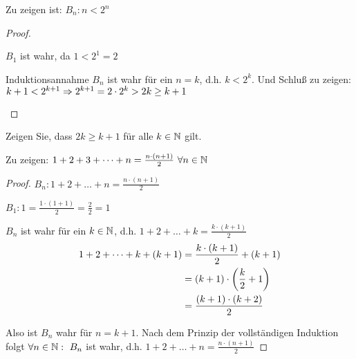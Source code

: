\begin{beispiel}
    Zu zeigen ist: $B_n: n < 2^{n}$
    \begin{proof}
        ~\\
        \begin{induktionsanfang}
            $B_1$ ist wahr, da $1<2^{1}=2$
        \end{induktionsanfang}
        \begin{induktionsschritt}
            Induktionsannahme $B_n$ ist wahr für ein $n=k$, d.h. $k<2^k$. Und Schluß zu zeigen: $k+1<2^{k+1} \Rightarrow{} 2^{k+1} = 2\cdot 2^{k} > 2k \geq k+1$\qedhere
        \end{induktionsschritt}
    \end{proof}
\end{beispiel}

\begin{uebung}
    Zeigen Sie, dass $2k\geq k+1$ für alle $k\in\mathbb{N}$ gilt.
\end{uebung}

\begin{beispiel}
    Zu zeigen: $1+2+3+\dots+n= \frac{n\cdot(n+1)}{2}~\forall n\in\mathbb{N}$
    \begin{proof}
        $B_n: 1+2+\dots+n = \frac{n\cdot(n+1)}{2}$\\
        \begin{induktionsanfang}
            $B_1: 1=\frac{1\cdot(1+1)}{2}=\frac{2}{2}=1$
        \end{induktionsanfang}
        \begin{induktionsschritt}
            $B_n$ ist wahr für ein $k\in\mathbb{N}$, d.h. $1+2+\dots+k=\frac{k\cdot(k+1)}{2}$
            \begin{align*}
                1+2+\dots+k+(k+1) &= \frac{k\cdot(k+1)}{2}+(k+1)\\
                &= (k+1)\cdot\left(\frac{k}{2}+1\right)\\
                &= \frac{(k+1)\cdot(k+2)}{2}
            \end{align*}
        \end{induktionsschritt}
        \noindent Also ist $B_n$ wahr für $n=k+1$. Nach dem Prinzip der vollständigen Induktion folgt $\forall n\in\mathbb{N}:~B_n$ ist wahr, d.h. $1+2+\dots+n=\frac{n\cdot(n+1)}{2}$\qedhere
    \end{proof}
\end{beispiel}

